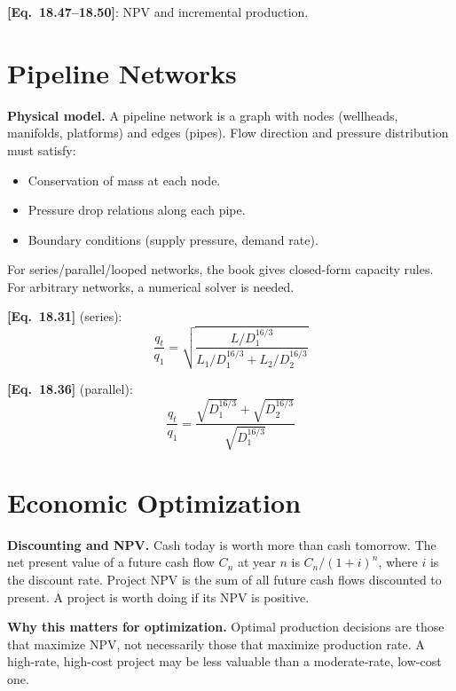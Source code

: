 \documentclass[11pt,a4paper,openany]{book}
\newcommand{\eqrefbook}[1]{\textcolor{blue!60!black}{\textbf{[Eq.~#1]}}}
\begin{document}
\eqrefbook{18.47--18.50}: NPV and incremental production.

\section{Pipeline Networks}

\begin{theory}
\textbf{Physical model.} A pipeline network is a graph with nodes
(wellheads, manifolds, platforms) and edges (pipes). Flow direction
and pressure distribution must satisfy:
\begin{itemize}
  \item Conservation of mass at each node.
  \item Pressure drop relations along each pipe.
  \item Boundary conditions (supply pressure, demand rate).
\end{itemize}

For series/parallel/looped networks, the book gives closed-form
capacity rules. For arbitrary networks, a numerical solver is needed.
\end{theory}

\eqrefbook{18.31} (series):
\begin{equation}
  \frac{q_t}{q_1} = \sqrt{\frac{L/D_1^{16/3}}
  {L_1/D_1^{16/3} + L_2/D_2^{16/3}}}
\end{equation}

\eqrefbook{18.36} (parallel):
\begin{equation}
  \frac{q_t}{q_1} = \frac{\sqrt{D_1^{16/3}} + \sqrt{D_2^{16/3}}}
  {\sqrt{D_1^{16/3}}}
\end{equation}

\section{Economic Optimization}

\begin{theory}
\textbf{Discounting and NPV.} Cash today is worth more than cash
tomorrow. The net present value of a future cash flow $C_n$ at year
$n$ is $C_n/(1+i)^n$, where $i$ is the discount rate. Project NPV is
the sum of all future cash flows discounted to present. A project is
worth doing if its NPV is positive.

\textbf{Why this matters for optimization.} Optimal production
decisions are those that maximize NPV, not necessarily those that
maximize production rate. A high-rate, high-cost project may be less
valuable than a moderate-rate, low-cost one.
\end{theory}
\end{document}
